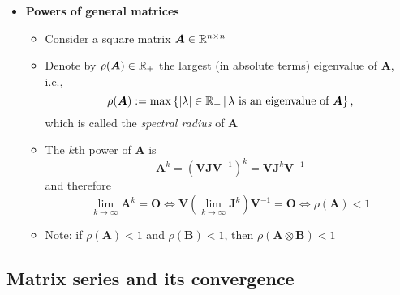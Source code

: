 \documentclass[12pt,a4paper]{article}
\begin{document}
\begin{itemize}
\item \textbf{Powers of general matrices}
  \begin{itemize}
  \item Consider a square matrix $\bm{A}\in \mathbb{R}^{n\times n}$
  \item Denote by $\rho(\bm{A})\in \mathbb{R}_{+}$ the largest (in absolute terms) eigenvalue of $\bm{A}$, i.e.,
    \begin{equation}\nonumber%
      \rho(\bm{A}) := \max\left\{ |\lambda|\in\R_{+} \,|\, \text{$\lambda$ is an eigenvalue of $\bm{A}$} \right\},
    \end{equation}
    which is called the \emph{spectral radius} of $\bm{A}$
  \item The $k$th power of $\bm{A}$ is
    \begin{equation}\nonumber%
      \bm{A}^{k}
      = (\bm{V} \bm{J} \bm{V}^{-1})^{k}
      = \bm{V} \bm{J}^{k} \bm{V}^{-1}
    \end{equation}
    and therefore
    \begin{equation}\nonumber%
      \lim_{k\to\infty}\bm{A}^{k} = \bm{O}
      \iff
      \bm{V} \left(\lim_{k\to \infty}\bm{J}^{k}\right)\bm{V}^{-1} = \bm{O}
      \iff
      \rho(\bm{A}) < 1
    \end{equation}
   \item Note: if $\rho(\bm{A})<1$ and $\rho(\bm{B})<1$, then $\rho(\bm{A}\otimes \bm{B})<1$
  \end{itemize}

\end{itemize}

\subsection{Matrix series and its convergence}
\end{document}
